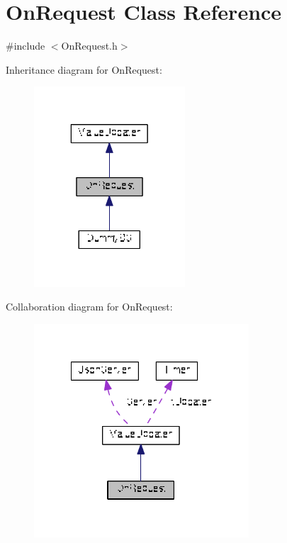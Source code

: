 \hypertarget{class_on_request}{\section{On\+Request Class Reference}
\label{class_on_request}
}


{\ttfamily \#include $<$On\+Request.\+h$>$}



Inheritance diagram for On\+Request\+:
\nopagebreak
\begin{figure}[H]
\begin{center}
\leavevmode
\includegraphics[width=160pt]{class_on_request__inherit__graph}
\end{center}
\end{figure}


Collaboration diagram for On\+Request\+:
\nopagebreak
\begin{figure}[H]
\begin{center}
\leavevmode
\includegraphics[width=227pt]{class_on_request__coll__graph}
\end{center}
\end{figure}
